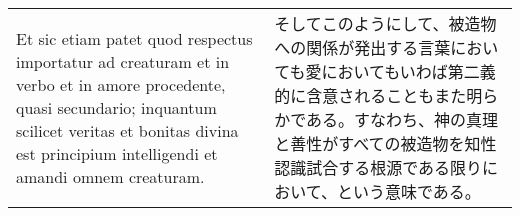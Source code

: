 \documentclass[10pt]{jsarticle} %
\begin{document}
\begin{longtable}{p{21em}p{21em}}
\\


Et
 sic etiam patet quod respectus importatur ad creaturam et in verbo et
 in amore procedente, quasi secundario; inquantum scilicet veritas et
 bonitas divina est principium intelligendi et amandi omnem creaturam.


&

そしてこのようにして、被造物への関係が発出する言葉においても愛においてもいわば第二義的に含意されることもまた明らかである。すなわち、神の真理と善性がすべての被造物を知性認識試合する根源である限りにおいて、という意味である。


\\
\end{longtable}
\end{document}
